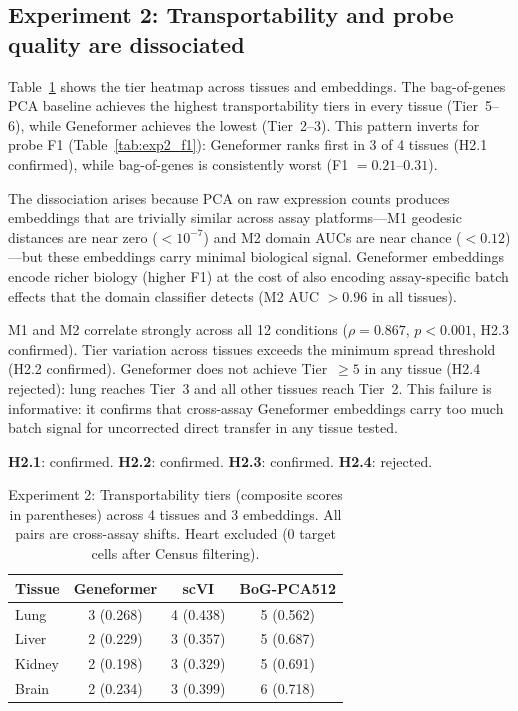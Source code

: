 \documentclass[11pt,letterpaper]{article}
\begin{document}
\subsection{Experiment 2: Transportability and probe quality are dissociated}

Table~\ref{tab:exp2_tiers} shows the tier heatmap across tissues and embeddings. The bag-of-genes PCA baseline achieves the highest transportability tiers in every tissue (Tier~5--6), while Geneformer achieves the lowest (Tier~2--3). This pattern inverts for probe F1 (Table~\ref{tab:exp2_f1}): Geneformer ranks first in 3 of 4 tissues (H2.1 confirmed), while bag-of-genes is consistently worst (F1 $= 0.21$--$0.31$).

The dissociation arises because PCA on raw expression counts produces embeddings that are trivially similar across assay platforms---M1 geodesic distances are near zero ($< 10^{-7}$) and M2 domain AUCs are near chance ($< 0.12$)---but these embeddings carry minimal biological signal. Geneformer embeddings encode richer biology (higher F1) at the cost of also encoding assay-specific batch effects that the domain classifier detects (M2 AUC $> 0.96$ in all tissues).

M1 and M2 correlate strongly across all 12 conditions ($\rho = 0.867$, $p < 0.001$, H2.3 confirmed). Tier variation across tissues exceeds the minimum spread threshold (H2.2 confirmed). Geneformer does not achieve Tier~$\geq 5$ in any tissue (H2.4 rejected): lung reaches Tier~3 and all other tissues reach Tier~2. This failure is informative: it confirms that cross-assay Geneformer embeddings carry too much batch signal for uncorrected direct transfer in any tissue tested.

\textbf{H2.1}: confirmed. \textbf{H2.2}: confirmed. \textbf{H2.3}: confirmed. \textbf{H2.4}: rejected.

\begin{table}[t]
\centering
\caption{Experiment 2: Transportability tiers (composite scores in parentheses) across 4 tissues and 3 embeddings. All pairs are cross-assay shifts. Heart excluded (0 target cells after Census filtering).}
\label{tab:exp2_tiers}
\small
\begin{tabular}{@{}lccc@{}}
\toprule
Tissue & Geneformer & scVI & BoG-PCA512 \\
\midrule
Lung   & 3 (0.268) & 4 (0.438) & 5 (0.562) \\
Liver  & 2 (0.229) & 3 (0.357) & 5 (0.687) \\
Kidney & 2 (0.198) & 3 (0.329) & 5 (0.691) \\
Brain  & 2 (0.234) & 3 (0.399) & 6 (0.718) \\
\bottomrule
\end{tabular}
\end{table}
\end{document}
